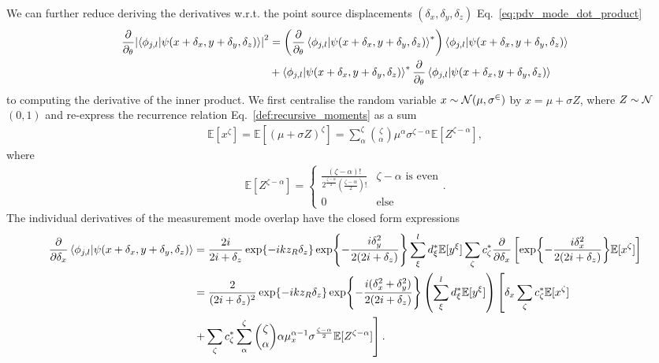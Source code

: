 \documentclass[reprint,amsmath,amssymb,aps,prl,floatfix,groupedaddress,superscriptaddress]{revtex4-2}
\begin{document}
We can further reduce deriving the derivatives w.r.t. the point source displacements $(\delta_x,\delta_y,\delta_z)$ Eq.~\eqref{eq:pdv_mode_dot_product}
\begin{align}
    \frac{\partial}{\partial_\theta} \abs{\braket{\phi_{j,l}}{\psi(x+\delta_x,y+\delta_y,\delta_z)}}^2 &= \left ( \frac{\partial}{\partial_\theta} \braket{\phi_{j,l}}{\psi(x+\delta_x,y+\delta_y,\delta_z)}^*\right ) \braket{\phi_{j,l}}{\psi(x+\delta_x,y+\delta_y,\delta_z)} \nonumber \\
    &+ \braket{\phi_{j,l}}{\psi(x+\delta_x,y+\delta_y,\delta_z)}^* \frac{\partial}{\partial_\theta} \braket{\phi_{j,l}}{\psi(x+\delta_x,y+\delta_y,\delta_z)}
\end{align}
to computing the derivative of the inner product. We first centralise the random variable $x \sim \cal{N} (\mu,\sigma^2)$ by $x=\mu + \sigma Z$, where $Z \sim \cal{N}$$(0,1)$ and re-express the recurrence relation Eq.~\eqref{def:recursive_moments} as a sum
\begin{align}
    \mathbb{E}[x^\zeta] = \mathbb{E}[(\mu + \sigma Z)^\zeta] = \sum_\alpha^\zeta \binom{\zeta}{\alpha} \mu^\alpha \sigma^{\zeta-\alpha} \mathbb{E}[Z^{\zeta-\alpha}],
\end{align}
where
\begin{align}
    \mathbb{E}[Z^{\zeta-\alpha}] = \begin{cases}
        \frac{(\zeta-\alpha)!}{2^{\frac{\zeta-\alpha}{2}} (\frac{\zeta-\alpha}{2})!} & \zeta-\alpha \text{ is even} \\
        0 & \text{else}
    \end{cases}.
\end{align}
The individual derivatives of the measurement mode overlap have the closed form expressions
\begin{align}
    \frac{\partial}{\partial \delta_x} \braket{\phi_{j,l}}{\psi(x+\delta_x,y+\delta_y,\delta_z)} &= \frac{2i}{2i + \delta_z}  \exp{-ikz_R\delta_z} \exp{-\frac{i \delta_y^2}{2(2i +\delta_z)}} \sum_\xi^l d^*_\xi \mathbb{E}[y^\xi]\sum_\zeta c^*_\zeta  \frac{\partial}{\partial \delta_x} \left [ \exp{-\frac{i\delta_x^2}{2(2i +\delta_z)}}\mathbb{E}[x^\zeta] \right ] \nonumber \\
    &=  \frac{2}{(2i + \delta_z)^2}  \exp{-ikz_R\delta_z} \exp{-\frac{i (\delta_x^2 + \delta_y^2)}{2(2i +\delta_z)}} \left ( \sum_\xi^l d^*_\xi \mathbb{E}[y^\xi] \right ) \left [ \delta_x \sum_\zeta c^*_\zeta \mathbb{E}[x^\zeta] \right. \nonumber \\
    & \left. + \sum_\zeta c^*_\zeta \sum^\zeta_\alpha \binom{\zeta}{\alpha} \alpha \mu_x^{\alpha-1} \sigma^{\frac{\zeta-\alpha}{2}}  \mathbb{E}[Z^{\zeta-\alpha}] \right ].

\end{align}$$
\end{document}
